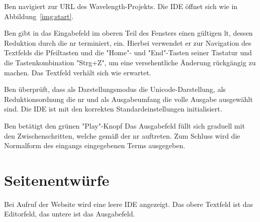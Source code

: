 \documentclass[parskip=full,11pt,twoside]{scrartcl}
\begin{document}
{Ben navigiert zur URL des Wavelength-Projekts.}
{Die IDE öffnet sich wie in Abbildung~\ref{img:start}.}

{Ben gibt in das Eingabefeld im oberen Teil des Fensters einen gültigen \gls{lt},
dessen Reduktion durch die \gls{nr} terminiert, ein.
Hierbei verwendet er zur Navigation des Textfelds die Pfeiltasten und die
"Home"- und "End"-Tasten seiner Tastatur und die Tastenkombination "Strg+Z", um eine
versehentliche Änderung rückgängig zu machen.}
{Das Textfeld verhält sich wie erwartet.}

{Ben überprüft, dass als Darstellungsmodus die Unicode-Darstellung, als Reduktionsordnung
die \gls{nr} und als Ausgabeumfang die volle Ausgabe ausgewählt sind.}
{Die IDE ist mit den korrekten Standardeinstellungen initialisiert.}

{Ben betätigt den grünen "Play"-Knopf}
{Das Ausgabefeld füllt sich graduell mit den Zwischenschritten, welche gemäß der \gls{nr} auftreten.
Zum Schluss wird die Normalform des eingangs eingegebenen Terms ausgegeben.}


%
%
%

\pagebreak
\appendix

\section{Seitenentwürfe}

Bei Aufruf der Website wird eine leere IDE angezeigt. Das obere Textfeld ist das Editorfeld, das untere ist das Ausgabefeld.
\end{document}
